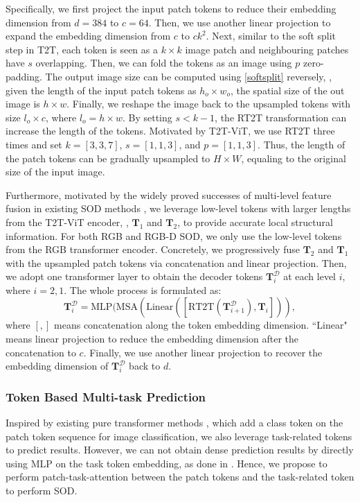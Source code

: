 \documentclass[10pt,twocolumn,letterpaper]{article}
\begin{document}
Specifically, we first project the input patch tokens to reduce their embedding dimension from $d=384$ to $c=64$.
Then, we use another linear projection to expand the embedding dimension from $c$ to $c k^2$.
Next, similar to the soft split step in T2T, each token is seen as a $k\times k$ image patch and neighbouring patches have $s$ overlapping. Then, we can fold the tokens as an image using $p$ zero-padding. The output image size can be computed using \eqref{softsplit} reversely, \ie, given the length of the input patch tokens as $h_o\times w_o$, the spatial size of the out image is $h\times w$. Finally, we reshape the image back to the upsampled tokens with size $l_o \times c$, where $l_o=h\times w$.
By setting $s<k-1$, the RT2T transformation can increase the length of the tokens. Motivated by T2T-ViT, we use RT2T three times and set $k = [3, 3, 7]$, $s = [1, 1, 3]$, and $p = [1, 1, 3]$. Thus, the length of the patch tokens can be gradually upsampled to $H\times W$, equaling to the original size of the input image.

Furthermore, motivated by the widely proved successes of multi-level feature fusion in existing SOD methods \cite{hou2018dss,MINet-CVPR2020,GateNet,fan2020bbsnet,luo2020Cas-Gnn}, we leverage low-level tokens with larger lengths from the T2T-ViT encoder, \ie, $\bm{T}_1$ and $\bm{T}_2$, to provide accurate local structural information.
For both RGB and RGB-D SOD, we only use the low-level tokens from the RGB transformer encoder.
Concretely, we progressively fuse $\bm{T}_2$ and $\bm{T}_1$ with the upsampled patch tokens via concatenation and linear projection. Then, we adopt one transformer layer to obtain the decoder tokens $\bm{T}^{\mathcal{D}}_i$ at each level $i$, where $i=2,1$. The whole process is formulated as:
\begin{equation} \label{decoder}
\bm{T}^{\mathcal{D}}_{i} = \text{MLP}(\text{MSA}(\text{Linear}([\text{RT2T}(\bm{T}^{\mathcal{D}}_{i+1}),\bm{T}_{i}])),
\end{equation}
where $[,]$ means concatenation along the token embedding dimension. ``Linear" means linear projection to reduce the embedding dimension after the concatenation to $c$. Finally, we use another linear projection to recover the embedding dimension of $\bm{T}^{\mathcal{D}}_{i}$ back to $d$.

\subsubsection{Token Based Multi-task Prediction}
Inspired by existing pure transformer methods \cite{yuan2021tokens,dosovitskiy2020image}, which add a class token on the patch token sequence for image classification, we also leverage task-related tokens to predict results.
However, we can not obtain dense prediction results by directly using MLP on the task token embedding, as done in \cite{yuan2021tokens,dosovitskiy2020image}. Hence, we propose to perform patch-task-attention between the patch tokens and the task-related token to perform SOD.
\end{document}
